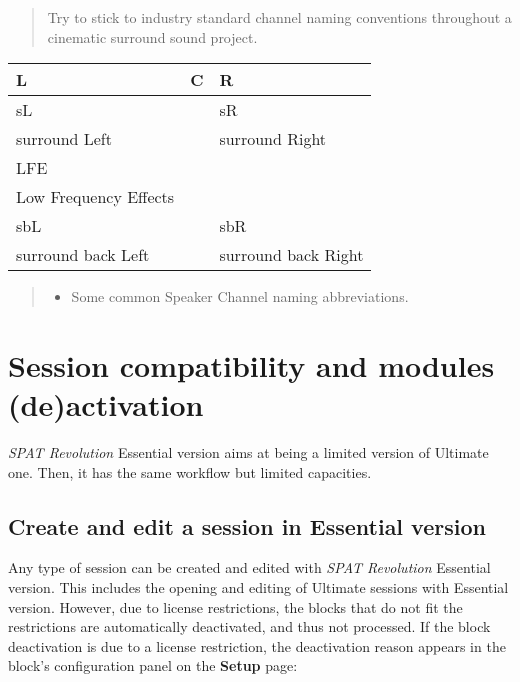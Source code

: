 \documentclass[
  letterpaper,
  DIV=11,
  numbers=noendperiod]{scrreport}
\providecommand{\tightlist}{%
  \setlength{\itemsep}{0pt}\setlength{\parskip}{0pt}}\usepackage{longtable,booktabs,array}
\begin{document}
\begin{quote}
Try to stick to industry standard channel naming conventions throughout
a cinematic surround sound project.
\end{quote}

\begin{longtable}[]{@{}lll@{}}
\toprule()
L & C & R \\
\midrule()
\endhead
sL & & sR \\
surround Left & & surround Right \\
LFE & & \\
Low Frequency Effects & & \\
sbL & & sbR \\
surround back Left & & surround back Right \\
\bottomrule()
\end{longtable}

\begin{quote}
\begin{itemize}
\tightlist
\item
  Some common Speaker Channel naming abbreviations.
\end{itemize}
\end{quote}

\hypertarget{session-compatibility-and-modules-deactivation}{%
\chapter{Session compatibility and modules
(de)activation}\label{session-compatibility-and-modules-deactivation}}

\emph{SPAT Revolution} Essential version aims at being a limited version
of Ultimate one. Then, it has the same workflow but limited capacities.

\hypertarget{create-and-edit-a-session-in-essential-version}{%
\section{Create and edit a session in Essential
version}\label{create-and-edit-a-session-in-essential-version}}

Any type of session can be created and edited with \emph{SPAT
Revolution} Essential version. This includes the opening and editing of
Ultimate sessions with Essential version. However, due to license
restrictions, the blocks that do not fit the restrictions are
automatically deactivated, and thus not processed. If the block
deactivation is due to a license restriction, the deactivation reason
appears in the block's configuration panel on the \textbf{Setup} page:
\end{document}
